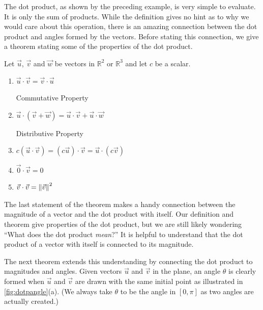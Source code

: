The dot product, as shown by the preceding example, is very simple to evaluate. It is only the sum of products. While the definition gives no hint as to why we would care about this operation, there is an amazing connection between the dot product and angles formed by the vectors. Before stating this connection, we give a theorem stating some of the properties of the dot product.

\begin{theorem}\label{thm:dot_product_properties}%
Let $\vec u$, $\vec v$ and $\vec w$ be vectors in $\mathbb{R}^2$ or $\mathbb{R}^3$ and let $c$ be a scalar.
\begin{enumerate}
	\item \parbox{150pt}{$\vec u\cdot\vec v = \vec v\cdot\vec u$}{Commutative Property}
	\item \parbox{150pt}{$\vec u\cdot(\vec v+\vec w) = \vec u\cdot\vec v + \vec u\cdot\vec w$}{Distributive Property}
	\item	$c(\vec u\cdot\vec v) = (c\vec u)\cdot \vec v = \vec u \cdot (c\vec v)$
	\item	$\vec 0\cdot\vec v = 0$
	\item	$\vec v\cdot\vec v=\left\lVert \vec v \right\rVert^2 $
\end{enumerate}
\end{theorem}

The last statement of the theorem makes a handy connection between the magnitude of a vector and the dot product with itself. Our definition and theorem give properties of the dot product, but we are still likely wondering ``What does the dot product \emph{mean}?'' It is helpful to understand that the dot product of a vector with itself is connected to its magnitude.

The next theorem extends this understanding by connecting the dot product to magnitudes and angles. Given vectors $\vec u$ and $\vec v$ in the plane, an angle $\theta$ is clearly formed when $\vec u$ and $\vec v$ are drawn with the same initial point as illustrated in \autoref{fig:dotpangle}(a). (We always take $\theta$ to be the angle in $[0,\pi]$ as two angles are actually created.) 


